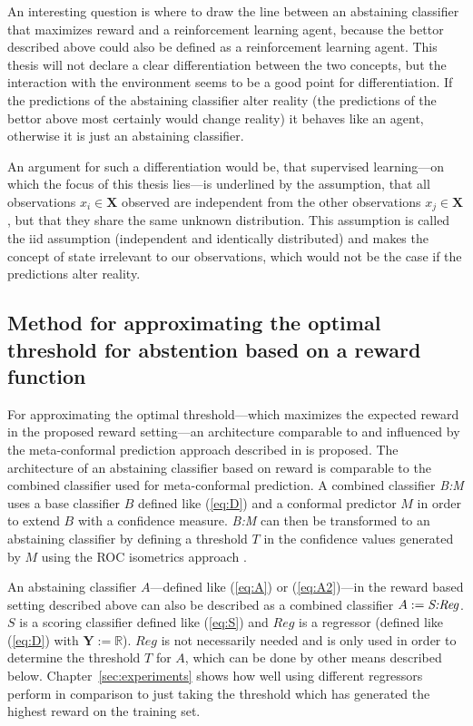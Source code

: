 \documentclass[twoside,11pt]{article}
\def\X{\textbf{X}}
\def\Y{\textbf{Y}}
\begin{document}
An interesting question is where to draw the line between
an abstaining classifier that maximizes reward and a
reinforcement learning agent, because the bettor described
above could also be defined as a reinforcement learning
agent.
This thesis will not declare a clear differentiation
between the two concepts, but the interaction with the
environment seems to be a good point for differentiation.
If the predictions of the abstaining classifier alter
reality (the predictions of the bettor above most certainly
would change reality) it behaves like an agent, otherwise
it is just an abstaining classifier.

An argument for such a differentiation would be, that
supervised learning---on which the focus of this thesis
lies---is underlined by the assumption, that all
observations $x_i \in \X$ observed are independent from the
other observations $x_j \in \X$, but that they share the
same unknown distribution.
This assumption is called the iid assumption (independent
and identically distributed) \citep[see][]{clauset_2011}
and makes the concept of state irrelevant to our
observations, which would not be the case if the
predictions alter reality.

\subsection{Method for approximating the optimal threshold
  for abstention based on a reward function}

For approximating the optimal threshold---which maximizes
the expected reward in the proposed reward setting---an
architecture comparable to and influenced by the
meta-confor\-mal prediction approach described in
\citet{smirnov_et_al_2009} is proposed.
The architecture of an abstaining classifier based on
reward is comparable to the combined classifier used for
meta-conformal prediction.
A combined classifier \textit{B:M} uses a base classifier
$B$ defined like (\ref{eq:D}) and a conformal predictor $M$
in order to extend $B$ with a confidence measure.
\textit{B:M} can then be transformed to an abstaining
classifier by defining a threshold $T$ in the confidence
values generated by $M$ using the ROC isometrics approach
\citep[see][]{smirnov_et_al_2009, vanderlooy_et_al_2009,
  fassbender_2019}.

An abstaining classifier $A$---defined like (\ref{eq:A}) or
(\ref{eq:A2})---in the reward based
setting described above can also be described as a
combined classifier $A := \text{\textit{S:Reg}}$.
$S$ is a scoring classifier defined like (\ref{eq:S}) and
$Reg$ is a regressor (defined like (\ref{eq:D}) with
$\Y := \mathbb{R}$).
$Reg$ is not necessarily needed and is only used in order
to determine the threshold $T$ for $A$, which can be done
by other means described below.
Chapter~\ref{sec:experiments} shows how well using
different regressors perform in comparison to just taking
the threshold which has generated the highest reward on the
training set.
\end{document}
